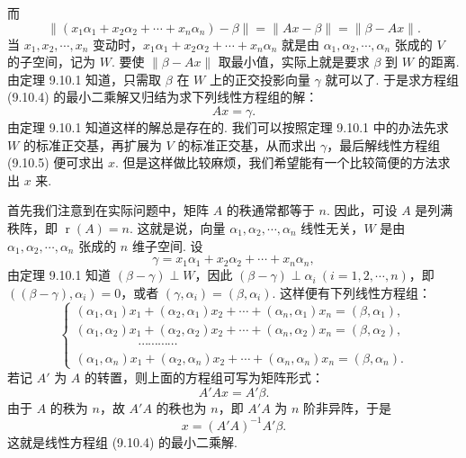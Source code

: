 \documentclass[UTF8,12pt,a4paper,fontset=fandol]{ctexart}
\begin{document}
而
\[
  \|(x_1\alpha_1+x_2\alpha_2+\cdots+x_n\alpha_n)-\beta\|
  =\|Ax-\beta\|=\|\beta-Ax\|.
\]
当 $x_1,x_2,\cdots,x_n$ 变动时，$x_1\alpha_1+x_2\alpha_2+\cdots+x_n\alpha_n$ 就是由 $\alpha_1,\alpha_2,\cdots,\alpha_n$ 张成的 $V$ 的子空间，记为 $W$. 要使 $\|\beta-Ax\|$ 取最小值，实际上就是要求 $\beta$ 到 $W$ 的距离. 由定理 9.10.1 知道，只需取 $\beta$ 在 $W$ 上的正交投影向量 $\gamma$ 就可以了. 于是求方程组 (9.10.4) 的最小二乘解又归结为求下列线性方程组的解：
\begin{equation}
  Ax=\gamma.
  \tag{9.10.5}
\end{equation}
由定理 9.10.1 知道这样的解总是存在的. 我们可以按照定理 9.10.1 中的办法先求 $W$ 的标准正交基，再扩展为 $V$ 的标准正交基，从而求出 $\gamma$，最后解线性方程组 (9.10.5) 便可求出 $x$. 但是这样做比较麻烦，我们希望能有一个比较简便的方法求出 $x$ 来.

首先我们注意到在实际问题中，矩阵 $A$ 的秩通常都等于 $n$. 因此，可设 $A$ 是列满秩阵，即 $\operatorname{r}(A)=n$. 这就是说，向量 $\alpha_1,\alpha_2,\cdots,\alpha_n$ 线性无关，$W$ 是由 $\alpha_1,\alpha_2,\cdots,\alpha_n$ 张成的 $n$ 维子空间. 设
\begin{equation}
  \gamma=x_1\alpha_1+x_2\alpha_2+\cdots+x_n\alpha_n,
  \tag{9.10.6}
\end{equation}
由定理 9.10.1 知道 $(\beta-\gamma)\perp W$，因此 $(\beta-\gamma)\perp\alpha_i\ (i=1,2,\cdots,n)$，即 $((\beta-\gamma),\alpha_i)=0$，或者 $(\gamma,\alpha_i)=(\beta,\alpha_i)$. 这样便有下列线性方程组：
\[
  \begin{cases}
    (\alpha_1,\alpha_1)x_1+(\alpha_2,\alpha_1)x_2+\cdots+(\alpha_n,\alpha_1)x_n=(\beta,\alpha_1),\\
    (\alpha_1,\alpha_2)x_1+(\alpha_2,\alpha_2)x_2+\cdots+(\alpha_n,\alpha_2)x_n=(\beta,\alpha_2),\\
    \hspace{5em}\cdots\cdots\cdots\cdots\\
    (\alpha_1,\alpha_n)x_1+(\alpha_2,\alpha_n)x_2+\cdots+(\alpha_n,\alpha_n)x_n=(\beta,\alpha_n).
  \end{cases}
\]
若记 $A'$ 为 $A$ 的转置，则上面的方程组可写为矩阵形式：
\[
  A'Ax=A'\beta.
\]
由于 $A$ 的秩为 $n$，故 $A'A$ 的秩也为 $n$，即 $A'A$ 为 $n$ 阶非异阵，于是
\[
  x=(A'A)^{-1}A'\beta.
\]
这就是线性方程组 (9.10.4) 的最小二乘解.
\end{document}
